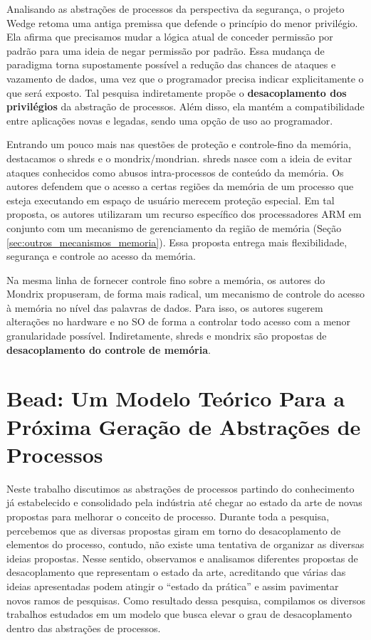 Analisando as abstrações de processos da perspectiva da segurança, o projeto
Wedge retoma uma antiga premissa que defende o princípio do menor privilégio.
Ela afirma que precisamos mudar a lógica atual de conceder permissão por
padrão para uma ideia de negar permissão por padrão. Essa mudança de paradigma
torna supostamente possível a redução das chances de ataques e vazamento de
dados, uma vez que o programador precisa indicar explicitamente o que será
exposto. Tal pesquisa indiretamente propõe o \textbf{desacoplamento dos
privilégios} da abstração de processos. Além disso, ela mantém a
compatibilidade entre aplicações novas e legadas, sendo uma opção de uso ao programador.

Entrando um pouco mais nas questões de proteção e controle-fino da memória,
destacamos o shreds e o mondrix/mondrian. shreds nasce com a ideia de evitar
ataques conhecidos como abusos intra-processos de conteúdo da memória. Os
autores defendem que o acesso a certas regiões da memória de um processo
que esteja executando em espaço de usuário merecem proteção especial. Em tal proposta, os
autores utilizaram um recurso específico dos processadores ARM em conjunto com
um mecanismo de gerenciamento da região de memória (Seção
\ref{sec:outros_mecanismos_memoria}). Essa proposta entrega mais flexibilidade,
segurança e controle ao acesso da memória.

Na mesma linha de fornecer controle fino sobre a memória, os autores do Mondrix
propuseram, de forma mais radical, um mecanismo de controle do acesso à memória
no nível das palavras de dados. Para isso, os autores sugerem alterações no
hardware e no SO de forma a controlar todo acesso com a menor granularidade
possível. Indiretamente, shreds e mondrix são propostas de
\textbf{desacoplamento do controle de memória}.

\section{Bead: Um Modelo Teórico Para a Próxima Geração de Abstrações de Processos}
\label{sec:bead}

Neste trabalho discutimos as abstrações de processos partindo do conhecimento
já estabelecido e consolidado pela indústria até chegar ao estado da arte de
novas propostas para melhorar o conceito de processo. Durante toda a pesquisa,
percebemos que as diversas propostas giram em torno do desacoplamento de
elementos do processo, contudo, não existe uma tentativa de organizar as
diversas ideias propostas. Nesse sentido, observamos e analisamos diferentes propostas de
desacoplamento que representam o estado da arte, acreditando que várias
das ideias apresentadas podem atingir o ``estado da prática'' e assim pavimentar
novos ramos de pesquisas. Como resultado dessa pesquisa, compilamos os diversos
trabalhos estudados em um modelo que busca elevar o grau de desacoplamento
dentro das abstrações de processos.


